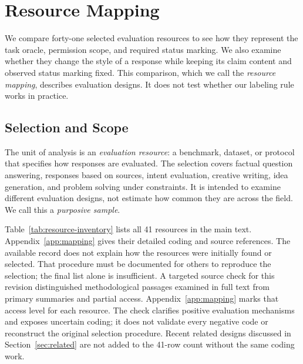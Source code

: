 \documentclass{clv2025}
\begin{document}
\section{Resource Mapping}\label{sec:methodology}

We compare forty-one selected evaluation resources to see how they represent
the task oracle, permission scope, and required status marking. We also
examine whether they change the style of a response while keeping its claim
content and observed status marking fixed. This comparison, which we call
the \emph{resource mapping}, describes evaluation designs. It does not test
whether our labeling rule works in practice.

\subsection{Selection and Scope}

The unit of analysis is an \emph{evaluation resource}: a benchmark, dataset,
or protocol that specifies how responses are evaluated. The selection covers
factual question answering, responses based on sources, intent evaluation,
creative writing, idea generation, and problem solving under constraints.
It is intended to examine different evaluation designs, not estimate how
common they are across the field. We call this a \emph{purposive sample}.

Table~\ref{tab:resource-inventory} lists all 41 resources in the main text.
Appendix~\ref{app:mapping} gives their detailed coding and source references. The available record does not explain how the resources were initially
found or selected. That procedure must be documented for others to reproduce
the selection; the final list alone is insufficient.
A targeted source check for this revision distinguished methodological
passages examined in full text from primary summaries and partial access.
Appendix~\ref{app:mapping} marks that access level for each resource.
The check clarifies positive evaluation mechanisms and exposes uncertain
coding; it does not validate every negative code or reconstruct the original
selection procedure. Recent related designs discussed in
Section~\ref{sec:related} are not added to the 41-row count without the same
coding work.
\end{document}
